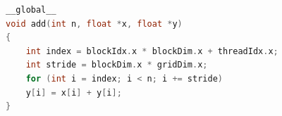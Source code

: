 \begin{lstlisting}[language=C++,
caption=Beispielhafter CUDA-Kernel zum Iterieren über zwei Datensätze \cite{Harris2017},
label=cuda_example]
__global__
void add(int n, float *x, float *y)
{
	int index = blockIdx.x * blockDim.x + threadIdx.x;
	int stride = blockDim.x * gridDim.x;
	for (int i = index; i < n; i += stride)
	y[i] = x[i] + y[i];
}
\end{lstlisting}